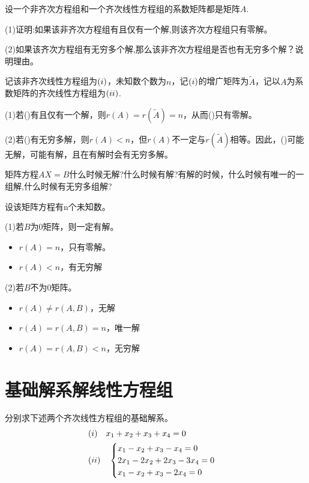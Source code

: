 \documentclass[a4paper]{report}
\begin{document}
\EX 设一个非齐次方程组和一个齐次线性方程组的系数矩阵都是矩阵$A$.

(1)证明:如果该非齐次方程组有且仅有一个解,则该齐次方程组只有零解。

(2)如果该齐次方程组有无穷多个解,那么该非齐次方程组是否也有无穷多个解？说明理由。

\begin{zhengming}
记该非齐次线性方程组为$(\uppercase\expandafter{\romannumeral1})$，未知数个数为$n$，记$(\uppercase\expandafter{\romannumeral1})$的增广矩阵为$\widetilde{A}$，记以$A$为系数矩阵的齐次线性方程组为$(\uppercase\expandafter{\romannumeral2})$.

(1)若(\uppercase\expandafter{})有且仅有一个解，则$r(A)=r(\widetilde{A})=n$，从而(\uppercase\expandafter{})只有零解。

(2)若(\uppercase\expandafter{})有无穷多解，则$r(A)<n$，但$r(A)$不一定与$r(\widetilde{A})$相等。因此，(\uppercase\expandafter{})可能无解，可能有解，且在有解时会有无穷多解。
\end{zhengming}

\EX 矩阵方程$AX = B$什么时候无解?什么时候有解?有解的时候，什么时候有唯一的一组解,什么时候有无穷多组解?

\begin{jie}
设该矩阵方程有n个未知数。

(1)若$B$为0矩阵，则一定有解。
\begin{itemize}
\item $r(A)=n$，只有零解。
\item $r(A)<n$，有无穷解
\end{itemize}

(2)若$B$不为0矩阵。
\begin{itemize}
  \item $r(A)\neq r(A,B)$，无解
  \item $r(A)= r(A,B)=n$，唯一解
  \item $r(A)= r(A,B)<n$，无穷解
\end{itemize}
\end{jie}

\clearpage
\section{基础解系解线性方程组}

\EX 分别求下述两个齐次线性方程组的基础解系。
\begin{align*}
&(\uppercase\expandafter{\romannumeral1})~~~ x_1+x_2+x_3+x_4=0\\
&(\uppercase\expandafter{\romannumeral2}) ~~~
\begin{cases}
x_1-x_2+x_3-x_4=0\\
2x_1-2x_2+2x_3-3x_4=0\\
x_1-x_2+x_3-2x_4=0
\end{cases}
\end{align*}
\end{document}
